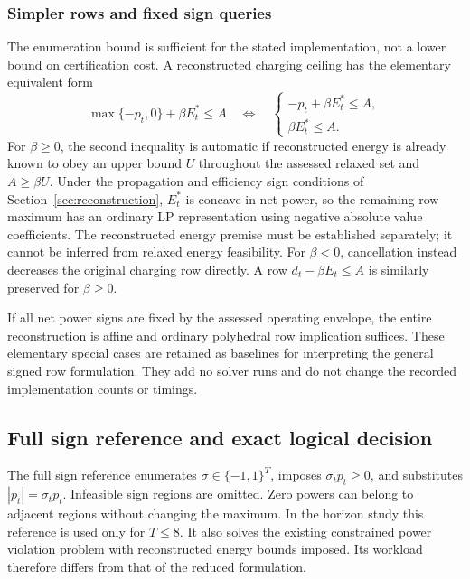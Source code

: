 \subsubsection*{Simpler rows and fixed sign queries}
The enumeration bound is sufficient for the stated implementation, not a
lower bound on certification cost. A reconstructed charging ceiling has the
elementary equivalent form
\begin{equation}
\max\{-p_t,0\}+\beta E_t^*\leq A
\quad\Longleftrightarrow\quad
\begin{cases}
-p_t+\beta E_t^*\leq A,\\
\beta E_t^*\leq A.
\end{cases}\label{eq:charging_normalization}
\end{equation}
For $\beta\geq0$, the second inequality is automatic if reconstructed energy
is already known to obey an upper bound $U$ throughout the assessed relaxed
set and $A\geq\beta U$. Under the propagation and efficiency sign conditions
of Section~\ref{sec:reconstruction}, $E_t^*$ is concave in net power, so the
remaining row maximum has an ordinary LP representation using negative
absolute value coefficients. The reconstructed energy premise must be
established separately; it cannot be inferred from relaxed energy feasibility.
For $\beta<0$, cancellation instead decreases the original charging row
directly. A row $d_t-\beta E_t\leq A$ is similarly preserved for $\beta\geq0$.

If all net power signs are fixed by the assessed operating envelope, the
entire reconstruction is affine and ordinary polyhedral row implication
suffices. These elementary special cases are retained as baselines for
interpreting the general signed row formulation. They add no solver runs
and do not change the recorded implementation counts or timings.

\subsection{Full sign reference and exact logical decision}
The full sign reference enumerates $\sigma\in\{-1,1\}^T$, imposes
$\sigma_tp_t\geq0$, and substitutes $|p_t|=\sigma_tp_t$. Infeasible sign
regions are omitted. Zero powers can belong to adjacent regions without
changing the maximum. In the horizon study this reference is used only for
$T\leq8$. It also solves the existing constrained power violation problem
with reconstructed energy bounds imposed. Its workload therefore differs
from that of the reduced formulation.

